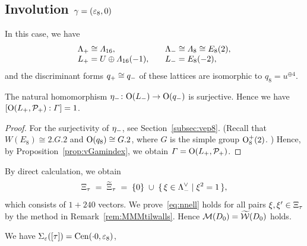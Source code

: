 \documentclass{amsart} %
\begin{document}
\subsection{Involution $\gamma=(\varepsilon_8, 0)$}\label{subsec:walls8}
%
In this case, we have
\[
\begin{array}{ll}
\Lambda_{+}\cong \varLambda_{16}, \quad   &\Lambda_{-}\cong \varLambda_{8}\cong E_8(2),\\
L_{+}= U\oplus \varLambda_{16}(-1), \quad &L_{-}=  E_8(-2),
\end{array}
\]
%
and the discriminant forms $q_{+}\cong q_{-}$ of these lattices are 
isomorphic to $q_8=u^{\oplus 4}$.
%
\begin{proposition}\label{prop:indexvep8}
The  natural homomorphism ${\eta}_{-}\colon \mathord{\mathrm{O}}(L_{-})\to \mathord{\mathrm{O}}(q_{-})$ is surjective.
Hence we have $[\mathord{\mathrm{O}}(L_{+}, \mathord{\mathcal{P}}_{+}): \varGamma]=1$.
\end{proposition}
%
\begin{proof}
For the surjectivity of ${\eta}_{-}$, see Section~\ref{subsec:vep8}.
(Recall that $W(E_8)\cong2.G.2$ and $\mathord{\mathrm{O}}(q_8)\cong G.2$, where $G$ is the simple group $\mathord{\mathrm{O}}^+_8(2)$. )
Hence, by Proposition~\ref{prop:vGamindex},  we obtain $\varGamma=\mathord{\mathrm{O}}(L_{+}, \mathord{\mathcal{P}}_{+})$.
\end{proof}
%
By direct calculation, we obtain 
\[
\Xi_{\tau}\;=\;\widetilde{\Xi}_{\tau} \; =\; \{0\}\;\cup\;\{\,{\xi\in \Lambda_{-}^{\vee}}\mid {\xi^2=1} \,\},
\]
which consists of $1+240$ vectors.
We prove~\eqref{eq:nnell} holds  for all pairs  $\xi, \xi^{\prime}\in \Xi_{\tau}$
by the method in Remark~\ref{rem:MMMtilwalls}.
Hence 
$\mathord{\mathcal{M}}(D_0)=\widetilde{\mathord{\mathcal{W}}}(D_0)$ holds.
%
%
%
%
%
\par
%
We have $\Sigma_{\varepsilon}([\tau])=\mathrm{Cen}(\cdot 0, \varepsilon_{8})$,
\end{document}
